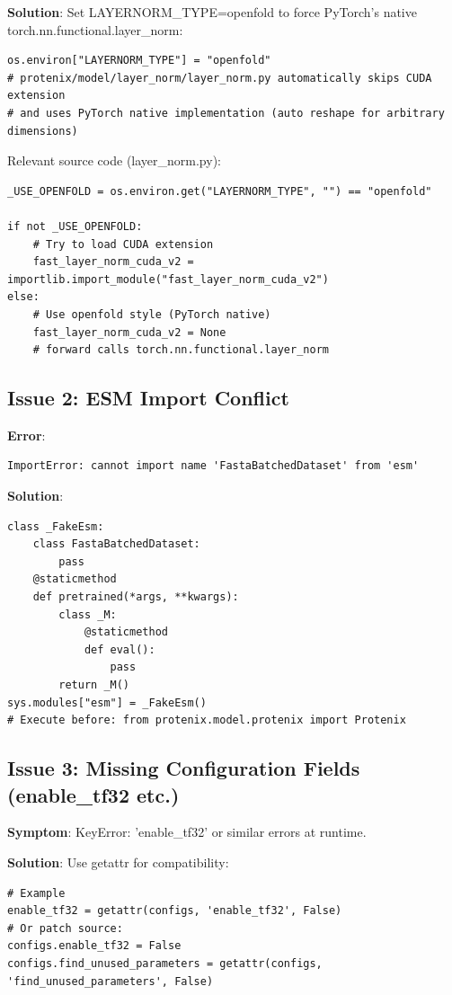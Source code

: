 \documentclass[12pt,a4paper]{article}
\begin{document}
\textbf{Solution}: Set LAYERNORM_TYPE=openfold to force PyTorch's native torch.nn.functional.layer_norm:

\begin{verbatim}
os.environ["LAYERNORM_TYPE"] = "openfold"
# protenix/model/layer_norm/layer_norm.py automatically skips CUDA extension
# and uses PyTorch native implementation (auto reshape for arbitrary dimensions)
\end{verbatim}

Relevant source code (layer_norm.py):
\begin{verbatim}
_USE_OPENFOLD = os.environ.get("LAYERNORM_TYPE", "") == "openfold"

if not _USE_OPENFOLD:
    # Try to load CUDA extension
    fast_layer_norm_cuda_v2 = importlib.import_module("fast_layer_norm_cuda_v2")
else:
    # Use openfold style (PyTorch native)
    fast_layer_norm_cuda_v2 = None
    # forward calls torch.nn.functional.layer_norm
\end{verbatim}

\subsection{Issue 2: ESM Import Conflict}

\textbf{Error}:
\begin{verbatim}
ImportError: cannot import name 'FastaBatchedDataset' from 'esm'
\end{verbatim}

\textbf{Solution}:
\begin{verbatim}
class _FakeEsm:
    class FastaBatchedDataset:
        pass
    @staticmethod
    def pretrained(*args, **kwargs):
        class _M:
            @staticmethod
            def eval():
                pass
        return _M()
sys.modules["esm"] = _FakeEsm()
# Execute before: from protenix.model.protenix import Protenix
\end{verbatim}

\subsection{Issue 3: Missing Configuration Fields (enable_tf32 etc.)}

\textbf{Symptom}: KeyError: 'enable_tf32' or similar errors at runtime.

\textbf{Solution}: Use getattr for compatibility:
\begin{verbatim}
# Example
enable_tf32 = getattr(configs, 'enable_tf32', False)
# Or patch source:
configs.enable_tf32 = False
configs.find_unused_parameters = getattr(configs, 'find_unused_parameters', False)
\end{verbatim}
\end{document}
